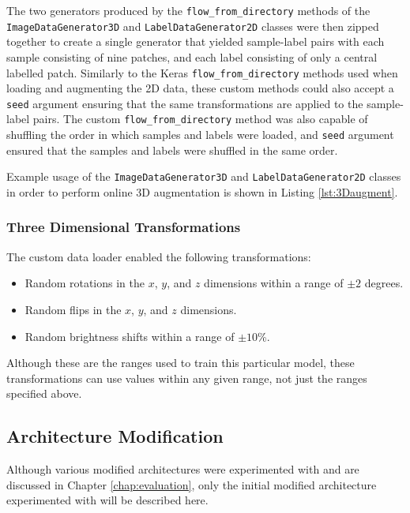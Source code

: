 The two generators produced by the \texttt{flow\_from\_directory} methods of the \texttt{ImageDataGenerator3D} and \texttt{LabelDataGenerator2D} classes were then zipped together to create a single generator that yielded sample-label pairs with each sample consisting of nine patches, and each label consisting of only a central labelled patch. Similarly to the Keras \texttt{flow\_from\_directory} methods used when loading and augmenting the 2D data, these custom methods could also accept a \texttt{seed} argument ensuring that the same transformations are applied to the sample-label pairs. The custom \texttt{flow\_from\_directory} method was also capable of shuffling the order in which samples and labels were loaded, and \texttt{seed} argument ensured that the samples and labels were shuffled in the same order.

Example usage of the \texttt{ImageDataGenerator3D} and \texttt{LabelDataGenerator2D} classes in order to perform online 3D augmentation is shown in Listing \ref{lst:3Daugment}.

\subsubsection{Three Dimensional Transformations}
\label{sec:3daug}

The custom data loader enabled the following transformations:
\begin{itemize}
    \item Random rotations in the $x$, $y$, and $z$ dimensions within a range of $\pm 2$ degrees.
    \item Random flips in the $x$, $y$, and $z$ dimensions.
    \item Random brightness shifts within a range of $\pm 10$\%.
\end{itemize}
Although these are the ranges used to train this particular model, these transformations can use values within any given range, not just the ranges specified above.


\subsection{Architecture Modification}

Although various modified architectures were experimented with and are discussed in Chapter \ref{chap:evaluation}, only the initial modified architecture experimented with will be described here.

